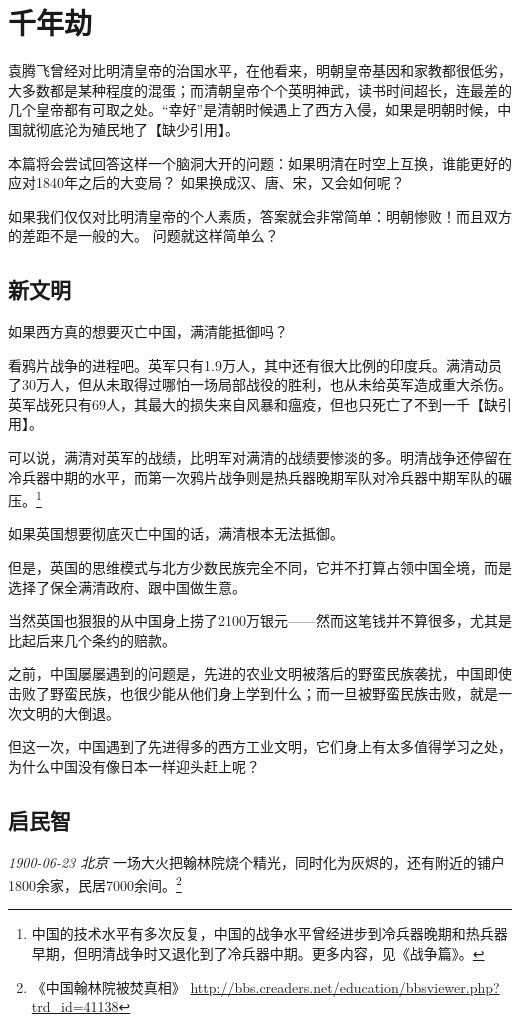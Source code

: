 \chapter{千年劫}
袁腾飞曾经对比明清皇帝的治国水平，在他看来，明朝皇帝基因和家教都很低劣，大多数都是某种程度的混蛋；而清朝皇帝个个英明神武，读书时间超长，连最差的几个皇帝都有可取之处。“幸好”是清朝时候遇上了西方入侵，如果是明朝时候，中国就彻底沦为殖民地了【缺少引用】。

本篇将会尝试回答这样一个脑洞大开的问题：如果明清在时空上互换，谁能更好的应对1840年之后的大变局？
如果换成汉、唐、宋，又会如何呢？

如果我们仅仅对比明清皇帝的个人素质，答案就会非常简单：明朝惨败！而且双方的差距不是一般的大。
问题就这样简单么？

\section{新文明}
如果西方真的想要灭亡中国，满清能抵御吗？

看鸦片战争的进程吧。英军只有1.9万人，其中还有很大比例的印度兵。满清动员了30万人，但从未取得过哪怕一场局部战役的胜利，也从未给英军造成重大杀伤。英军战死只有69人，其最大的损失来自风暴和瘟疫，但也只死亡了不到一千【缺引用】。

可以说，满清对英军的战绩，比明军对满清的战绩要惨淡的多。明清战争还停留在冷兵器中期的水平，而第一次鸦片战争则是热兵器晚期军队对冷兵器中期军队的碾压。\footnote{中国的技术水平有多次反复，中国的战争水平曾经进步到冷兵器晚期和热兵器早期，但明清战争时又退化到了冷兵器中期。更多内容，见《战争篇》。}

如果英国想要彻底灭亡中国的话，满清根本无法抵御。

\zPar
但是，英国的思维模式与北方少数民族完全不同，它并不打算占领中国全境，而是选择了保全满清政府、跟中国做生意。

当然英国也狠狠的从中国身上捞了2100万银元——然而这笔钱并不算很多，尤其是比起后来几个条约的赔款。

之前，中国屡屡遇到的问题是，先进的农业文明被落后的野蛮民族袭扰，中国即使击败了野蛮民族，也很少能从他们身上学到什么；而一旦被野蛮民族击败，就是一次文明的大倒退。

但这一次，中国遇到了先进得多的西方工业文明，它们身上有太多值得学习之处，为什么中国没有像日本一样迎头赶上呢？

\section{启民智}
\textit{1900-06-23 北京}
一场大火把翰林院烧个精光，同时化为灰烬的，还有附近的铺户1800余家，民居7000余间。\footnote{《中国翰林院被焚真相》 \url{http://bbs.creaders.net/education/bbsviewer.php?trd_id=41138}}

